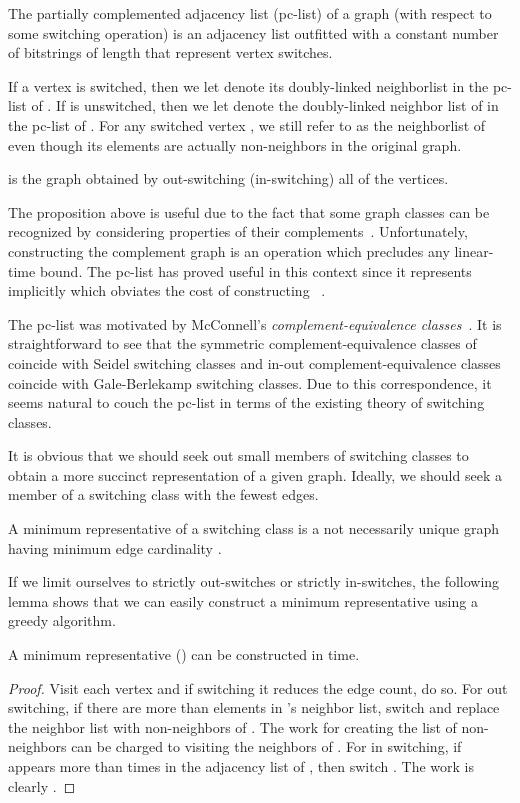 \documentclass{llncs}
\begin{document}
\begin{definition}
The partially complemented adjacency list (pc-list) of a graph  (with respect to some switching operation) is an adjacency list outfitted with a constant number of bitstrings of length  that represent vertex switches.
\end{definition}
If a vertex  is switched, then we let  denote its doubly-linked neighborlist in the pc-list of .  If  is unswitched, then we let  denote the doubly-linked neighbor list of  in the pc-list of .  For any switched vertex , we still refer to  as the neighborlist of  even though its elements are actually non-neighbors in the original graph.

\begin{proposition}
 is the graph obtained by out-switching (in-switching) all of the vertices.
\end{proposition}
\noindent The proposition above is useful due to the fact that some graph classes can be recognized by considering properties of their complements~\cite{McConnellS99}. Unfortunately, constructing the complement graph  is an  operation which precludes any linear-time bound.  The pc-list has proved useful in this context since it represents  implicitly which obviates the  cost of constructing ~\cite{DahlhausGM02,McConnellS99}.

The pc-list was motivated by McConnell's \emph{complement-equivalence classes}~\cite{McConnell97}.  It is straightforward to see that the symmetric complement-equivalence classes of~\cite{DahlhausGM02} coincide with Seidel switching classes and in-out complement-equivalence classes~\cite{DahlhausGM02} coincide with Gale-Berlekamp switching classes.  Due to this correspondence, it seems natural to couch the pc-list in terms of the existing theory of switching classes. 

It is obvious that we should seek out small members of switching classes to obtain a more succinct representation of a given graph.  Ideally, we should seek a member of a switching class with the fewest edges.
\begin{definition}
A minimum representative of a switching class  is a not necessarily unique graph  having minimum edge cardinality .
\end{definition}
If we limit ourselves to strictly out-switches or strictly in-switches, the following lemma shows that we can easily construct a minimum representative using a greedy algorithm.
\begin{lemma}\label{lem:buildOut}
\cite{DahlhausGM02} A minimum representative  () can be constructed in  time.
\end{lemma}
\begin{proof}
Visit each vertex and if switching it reduces the edge count, do so. For out switching, if there are more than  elements in 's neighbor list, switch  and replace the neighbor list with non-neighbors of .  The work for creating the list of non-neighbors can be charged to visiting the neighbors of . For in switching, if  appears more than  times in the adjacency list of , then switch .  The work is clearly .
\end{proof}
\end{document}
